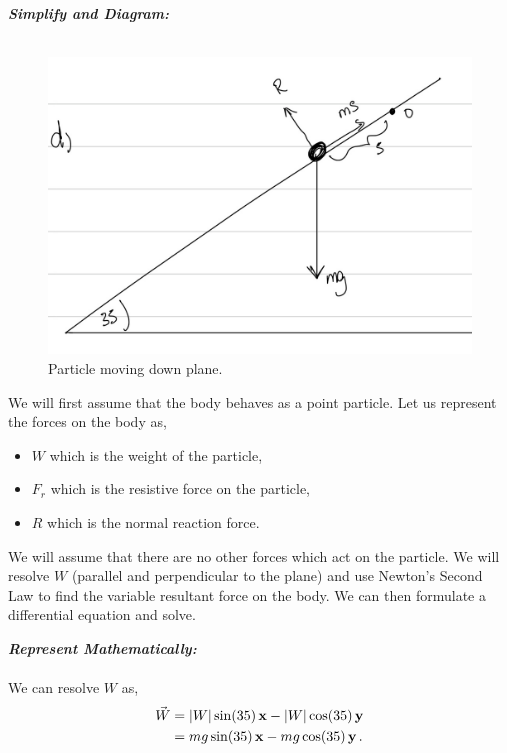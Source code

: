 \begin{subquestions}
\textbf{\textit{Simplify and Diagram:}} \\ \\
\begin{figure}[H]
	\begin{center}
		\includegraphics[scale=0.25]{../2014/figures/2014q6-4}
		\caption{\label{2014:q6:Diagram4} Particle moving down plane.}
	\end{center}
\end{figure}
We will first assume that the body behaves as a point particle. Let us represent the forces on the body as,
\begin{itemize}
	\item $W$ which is the weight of the particle,
	\item $F_r$ which is the resistive force on the particle,
	\item $R$ which is the normal reaction force.
\end{itemize}
We will assume that there are no other forces which act on the particle. We will resolve $W$ (parallel and perpendicular to the plane) and use Newton's Second Law to find the variable resultant force on the body. We can then formulate a differential equation and solve.




\textbf{\textit{Represent Mathematically:}} \\ \\
We can resolve $W$ as,
\begin{align}
	\vec{W} & = |W|\sin(35)\,\mathbf{x} - |W|\cos(35)\,\mathbf{y} \nonumber \\
	        & = mg\sin(35)\,\mathbf{x} - mg\cos(35)\,\mathbf{y} \,.
\end{align}


\end{subquestions}
